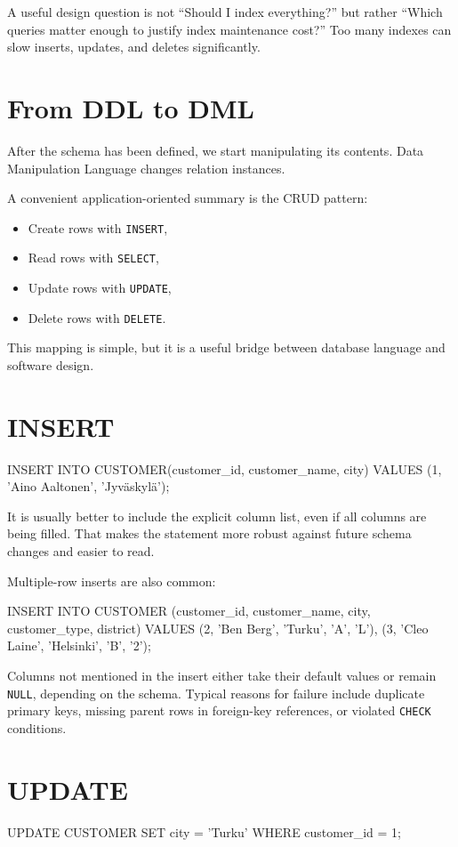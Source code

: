 \documentclass[11pt,a4paper,openany]{book}
\begin{document}
A useful design question is not ``Should I index everything?'' but rather ``Which queries matter enough to justify index maintenance cost?'' Too many indexes can slow inserts, updates, and deletes significantly.

\section{From DDL to DML}
After the schema has been defined, we start manipulating its contents. Data Manipulation Language changes relation instances.

A convenient application-oriented summary is the CRUD pattern:
\begin{itemize}
\item Create rows with \texttt{INSERT},
\item Read rows with \texttt{SELECT},
\item Update rows with \texttt{UPDATE},
\item Delete rows with \texttt{DELETE}.
\end{itemize}

This mapping is simple, but it is a useful bridge between database language and software design.

\section{INSERT}
\begin{codesql}
INSERT INTO CUSTOMER(customer_id, customer_name, city)
VALUES (1, 'Aino Aaltonen', 'Jyväskylä');
\end{codesql}

It is usually better to include the explicit column list, even if all columns are being filled. That makes the statement more robust against future schema changes and easier to read.

Multiple-row inserts are also common:
\begin{codesql}
INSERT INTO CUSTOMER (customer_id, customer_name, city, customer_type, district)
VALUES
  (2, 'Ben Berg', 'Turku', 'A', 'L'),
  (3, 'Cleo Laine', 'Helsinki', 'B', '2');
\end{codesql}

Columns not mentioned in the insert either take their default values or remain \texttt{NULL}, depending on the schema. Typical reasons for failure include duplicate primary keys, missing parent rows in foreign-key references, or violated \texttt{CHECK} conditions.

\section{UPDATE}
\begin{codesql}
UPDATE CUSTOMER
SET city = 'Turku'
WHERE customer_id = 1;
\end{codesql}
\end{document}
